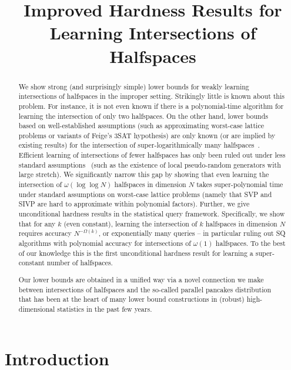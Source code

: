 \documentclass{theoretics}
\title{
  Improved Hardness Results for Learning Intersections of Halfspaces
}
\begin{document}
\maketitle
\begin{abstract}

We show strong (and surprisingly simple) lower bounds for weakly learning intersections of halfspaces in the improper setting. 
Strikingly little is known about this problem.
For instance, it is not even known if there is a polynomial-time algorithm for learning the intersection of only two halfspaces.
On the other hand, lower bounds based on well-established assumptions (such as approximating worst-case lattice problems or variants of Feige's 3SAT hypothesis) are only known (or are implied by existing results) for the intersection of super-logarithmically many halfspaces~\cite{klivans2009cryptographic,klivans2006cryptographic,daniely2016complexity}.
Efficient learning of intersections of fewer halfspaces has only been ruled out under less standard assumptions~\cite{daniely2021local} (such as the existence of local pseudo-random generators with large stretch).
We significantly narrow this gap by showing that even learning the intersection of $\omega(\log \log N)$ halfspaces in dimension $N$ takes super-polynomial time under standard assumptions on worst-case lattice problems (namely that SVP and SIVP are hard to approximate within polynomial factors).
Further, we give unconditional hardness results in the statistical query framework.
Specifically, we show that for any $k$ (even constant), learning the intersection of $k$ halfspaces in dimension $N$ requires accuracy $N^{-\Omega(k)}$, or exponentially many queries -- in particular ruling out SQ algorithms with polynomial accuracy for intersections of $\omega(1)$ halfspaces.
To the best of our knowledge this is the first unconditional hardness result for learning a super-constant number of halfspaces.

Our lower bounds are obtained in a unified way via a novel connection we make between intersections of halfspaces and the so-called parallel pancakes distribution~\cite{DKS17,bubeck2019adversarial,CLWE} that has been at the heart of many lower bound constructions in (robust)  high-dimensional statistics in the past few years.


\end{abstract}


\section{Introduction}
\end{document}
